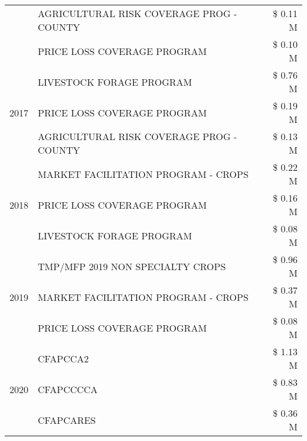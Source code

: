 \begin{tabular}{llr}
 & AGRICULTURAL RISK COVERAGE PROG - COUNTY      & \$ 0.11 M \\
 & PRICE LOSS COVERAGE PROGRAM                   & \$ 0.10 M \\
\cline{1-3}
\multirow[t]{3}{*}{2017} & LIVESTOCK FORAGE PROGRAM & \$ 0.76 M \\
 & PRICE LOSS COVERAGE PROGRAM & \$ 0.19 M \\
 & AGRICULTURAL RISK COVERAGE PROG - COUNTY & \$ 0.13 M \\
\cline{1-3}
\multirow[t]{3}{*}{2018} & MARKET FACILITATION PROGRAM - CROPS & \$ 0.22 M \\
 & PRICE LOSS COVERAGE PROGRAM & \$ 0.16 M \\
 & LIVESTOCK FORAGE PROGRAM & \$ 0.08 M \\
\cline{1-3}
\multirow[t]{3}{*}{2019} & TMP/MFP 2019 NON SPECIALTY CROPS & \$ 0.96 M \\
 & MARKET FACILITATION PROGRAM - CROPS & \$ 0.37 M \\
 & PRICE LOSS COVERAGE PROGRAM & \$ 0.08 M \\
\cline{1-3}
\multirow[t]{3}{*}{2020} & CFAPCCA2 & \$ 1.13 M \\
 & CFAPCCCCA & \$ 0.83 M \\
 & CFAPCARES & \$ 0.36 M \\
\cline{1-3}
\bottomrule
\end{tabular}
